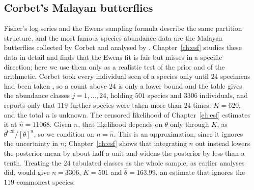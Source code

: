 \subsection{Corbet's Malayan butterflies}

Fisher's log series and the Ewens sampling formula describe the same partition structure, and the most famous species abundance data are the Malayan butterflies collected by Corbet and analysed by \citet{rc:fisher1943}. Chapter~\ref{ch:esf} studies these data in detail and finds that the Ewens fit is fair but misses in a specific direction; here we use them only as a realistic test of the prior and of the arithmetic. Corbet took every individual seen of a species only until $24$ specimens had been taken \citep[p.~43]{rc:fisher1943}, so a count above $24$ is only a lower bound and the table gives the abundance classes $j=1,\dots,24$, holding $501$ species and $3306$ individuals, and reports only that $119$ further species were taken more than $24$ times: $K=620$, and the total $n$ is unknown. The censored likelihood of Chapter~\ref{ch:esf} estimates it at $\hat n=11068$. Given $n$, that likelihood depends on $\theta$ only through $K$, as $\theta^{620}/[\theta]^{n}$, so we condition on $n=\hat n$. This is an approximation, since it ignores the uncertainty in $n$; Chapter~\ref{ch:esf} shows that integrating $n$ out instead lowers the posterior mean by about half a unit and widens the posterior by less than a tenth. Treating the $24$ tabulated classes as the whole sample, as earlier analyses did, would give $n=3306$, $K=501$ and $\hat\theta=163.99$, an estimate that ignores the $119$ commonest species.

